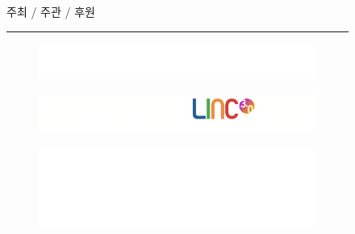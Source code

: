 \begin{figure}[h]
    \begin{center}
    \vspace*{2.5cm}
    
    {\color{white}\large{주최 / 주관 / 후원}}
    
    {\color{gray}\rule{0.25\textwidth}{0.8pt}}
    
    \vspace*{0.8cm}
    \begin{subfigure}{0.3\textwidth}
        \centering  
        \includegraphics[width=0.95\linewidth]{sponsor/white/ajouw.png}
    \end{subfigure}
    \begin{subfigure}{0.3\textwidth}
        \centering
        \includegraphics[width=0.93\linewidth]{sponsor/white/linkw.png} 
    \end{subfigure}

    \vspace*{1.2cm}
    \begin{subfigure}{\textwidth}
        \centering
        \includegraphics[width=0.085\linewidth]{sponsor/white/ansi_w.png}
    \end{subfigure}


\end{center}
\end{figure}
